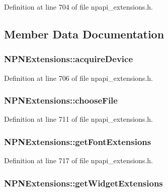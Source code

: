 Definition at line 704 of file npapi\_\-extensions.h.



\subsection{Member Data Documentation}
\hypertarget{struct_n_p_n_extensions_aac32128f303a0affff3f9ee28834d643}{
\subsubsection[{acquireDevice}]{ {\bf NPNExtensions::acquireDevice}}}
\label{struct_n_p_n_extensions_aac32128f303a0affff3f9ee28834d643}


Definition at line 706 of file npapi\_\-extensions.h.

\hypertarget{struct_n_p_n_extensions_a76ad1f3f35ed05ae67ab266ee8ca74d8}{
\subsubsection[{chooseFile}]{ {\bf NPNExtensions::chooseFile}}}
\label{struct_n_p_n_extensions_a76ad1f3f35ed05ae67ab266ee8ca74d8}


Definition at line 711 of file npapi\_\-extensions.h.

\hypertarget{struct_n_p_n_extensions_a0bd6f792efd096c2e3ae79b5a11f5d90}{
\subsubsection[{getFontExtensions}]{ {\bf NPNExtensions::getFontExtensions}}}
\label{struct_n_p_n_extensions_a0bd6f792efd096c2e3ae79b5a11f5d90}


Definition at line 717 of file npapi\_\-extensions.h.

\hypertarget{struct_n_p_n_extensions_ac03f0c4046b3419a575dfe1bb3d79e0a}{
\subsubsection[{getWidgetExtensions}]{ {\bf NPNExtensions::getWidgetExtensions}}}
\label{struct_n_p_n_extensions_ac03f0c4046b3419a575dfe1bb3d79e0a}


